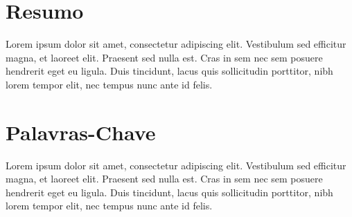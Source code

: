 \section*{Resumo}
\label{sec:resumo}


Lorem ipsum dolor sit amet, consectetur adipiscing elit. Vestibulum sed efficitur magna, et laoreet elit. Praesent sed nulla est. Cras in sem nec sem posuere hendrerit eget eu ligula. Duis tincidunt, lacus quis sollicitudin porttitor, nibh lorem tempor elit, nec tempus nunc ante id felis.




\section*{Palavras-Chave}
\label{sec:palavras}

Lorem ipsum dolor sit amet, consectetur adipiscing elit. Vestibulum sed efficitur magna, et laoreet elit. Praesent sed nulla est. Cras in sem nec sem posuere hendrerit eget eu ligula. Duis tincidunt, lacus quis sollicitudin porttitor, nibh lorem tempor elit, nec tempus nunc ante id felis. 
